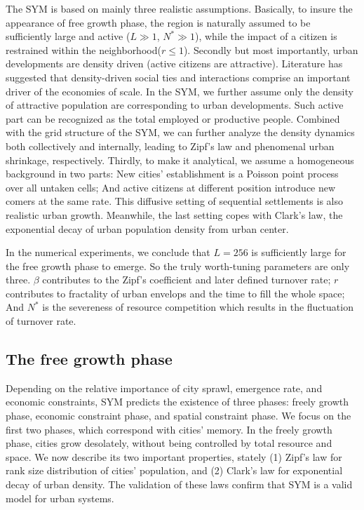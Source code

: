 \documentclass[reprint,unsortedaddress,amsmath,amssymb,aps,prl,showkeys]{revtex4-2}
\begin{document}
The SYM is based on mainly three realistic assumptions. Basically, to insure the appearance of free growth phase, the region is naturally assumed to be sufficiently large and active ($L\gg 1$, $N^*\gg 1$), while the impact of a citizen is restrained within the neighborhood($r\le 1$). Secondly but most importantly, urban developments are density driven (active citizens are attractive). Literature has suggested that density-driven social ties and interactions comprise an important driver of the economies of scale\cite{pan2013urban, girardin2009quantifying, batty1992form}. In the SYM, we further assume only the density of attractive population are corresponding to urban developments. Such active part can be recognized as the total employed or productive people. Combined with the grid structure of the SYM, we can further analyze the density dynamics both collectively and internally, leading to Zipf's law and phenomenal urban shrinkage, respectively. Thirdly, to make it analytical, we assume a homogeneous background in two parts: New cities' establishment is a Poisson point process over all untaken cells\cite{miles1970homogeneous}; And active citizens at different position introduce new comers at the same rate. This diffusive setting of sequential settlements is also realistic urban growth\cite{RevModPhys.87.925}. Meanwhile, the last setting copes with Clark's law, the exponential decay of urban population density from urban center\cite{clark1951urban}.

In the numerical experiments, we conclude that $L = 256$ is sufficiently large for the free growth phase to emerge. So the truly worth-tuning parameters are only three. $\beta$ contributes to the Zipf's coefficient and later defined turnover rate\cite{rooney2006structural}; $r$ contributes to fractality of urban envelops and the time to fill the whole space; And $N^*$ is the severeness of resource competition which results in the fluctuation of turnover rate.

\subsection{The free growth phase}

Depending on the relative importance of city sprawl, emergence rate, and economic constraints, SYM predicts the existence of three phases: freely growth phase, economic constraint phase, and spatial constraint phase. We focus on the first two phases, which correspond with cities' memory. In the freely growth phase, cities grow desolately, without being controlled by total resource and space. We now describe its two important properties, stately (1) Zipf's law\cite{gabaix1999zipf's} for rank size distribution of cities' population, and (2) Clark's law for exponential decay of urban density. The validation of these laws confirm that SYM is a valid model for urban systems.
\end{document}

